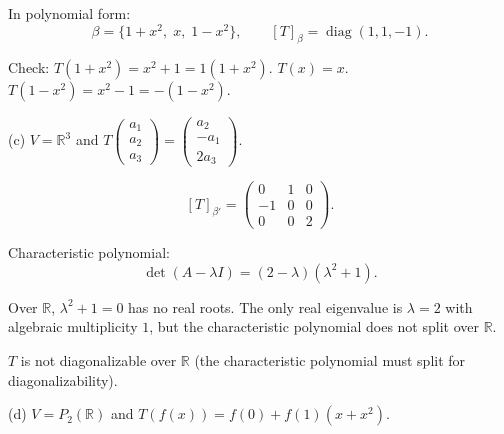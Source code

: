 \documentclass{article}
\begin{document}
\begin{mdframed}[linewidth=1pt]
In polynomial form:
\[
\boxed{\beta = \{1 + x^2,\; x,\; 1 - x^2\}, \qquad [T]_\beta = \operatorname{diag}(1, 1, -1).}
\]

\textnormal{Check:} $T(1 + x^2) = x^2 + 1 = 1(1+x^2)$. $T(x) = x$. $T(1 - x^2) = x^2 - 1 = -(1 - x^2)$.\end{mdframed}

\bigskip

\noindent\textnormal{(c)} $V = \mathbb{R}^3$ and $T\begin{pmatrix}a_1\\a_2\\a_3\end{pmatrix} = \begin{pmatrix}a_2\\-a_1\\2a_3\end{pmatrix}$.

\begin{mdframed}[linewidth=1pt]
\[
[T]_{\beta'} = \begin{pmatrix} 0 & 1 & 0 \\ -1 & 0 & 0 \\ 0 & 0 & 2 \end{pmatrix}.
\]

\textnormal{Characteristic polynomial:}
\[
\det(A - \lambda I) = (2 - \lambda)(\lambda^2 + 1).
\]

Over $\mathbb{R}$, $\lambda^2 + 1 = 0$ has no real roots. The only real eigenvalue is $\lambda = 2$ with algebraic multiplicity $1$, but the characteristic polynomial does not split over $\mathbb{R}$.

$T$ is \textnormal{not diagonalizable} over $\mathbb{R}$ (the characteristic polynomial must split for diagonalizability).
\end{mdframed}

\bigskip

\noindent\textnormal{(d)} $V = P_2(\mathbb{R})$ and $T(f(x)) = f(0) + f(1)(x + x^2)$.
\end{document}
